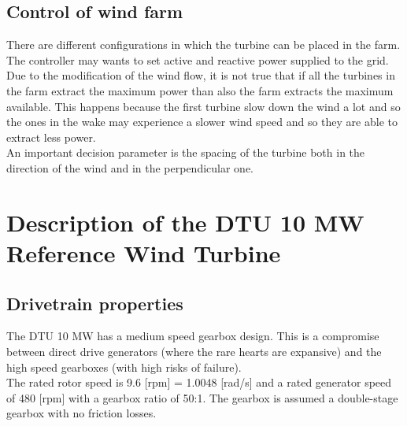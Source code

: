 \documentclass[]{article}
\begin{document}
\subsection{Control of wind farm}
There are different configurations in which the turbine can be placed in the farm. \\
The controller may wants to set active and reactive power supplied to the grid.\\
Due to the modification of the wind flow, it is not true that if all the turbines in the farm extract the maximum power than also the farm extracts the maximum available. This happens because the first turbine slow down the wind a lot and so the ones in the wake may experience a slower wind speed and so they are able to extract less power.\\
An important decision parameter is the spacing of the turbine both in the direction of the wind and in the perpendicular one. 

\section{Description of the DTU 10 MW Reference Wind Turbine}
\subsection{Drivetrain properties}
The DTU 10 MW has a medium speed gearbox design. This is a compromise between direct drive generators (where the rare hearts are expansive) and the high speed gearboxes (with high risks of failure).\\
The rated rotor speed is 9.6 [rpm] = 1.0048 [rad/s] and a rated generator speed of 480 [rpm] with a gearbox ratio of 50:1. The gearbox is assumed a double-stage gearbox with no friction losses.  
{\footnotesize
}
\end{document}
